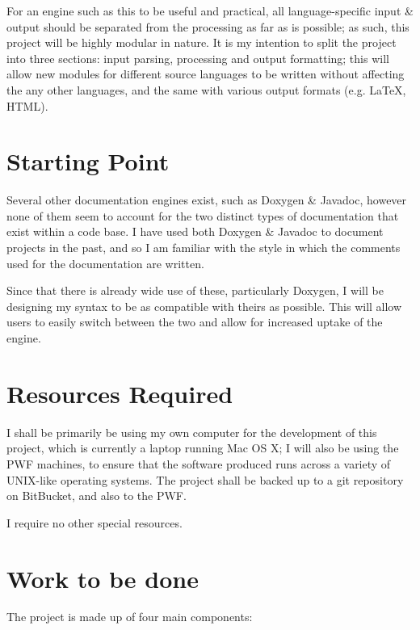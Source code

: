 For an engine such as this to be useful and practical, all
language-specific input \& output should be separated from the
processing as far as is possible; as such, this project will be highly
modular in nature. It is my intention to split the project into three
sections: input parsing, processing and output formatting; this will
allow new modules for different source languages to be written without
affecting the any other languages, and the same with various output
formats (e.g. \LaTeX, HTML).

\pagebreak

\section{Starting Point}

Several other documentation engines exist, such as Doxygen \& Javadoc,
however none of them seem to account for the two distinct types of
documentation that exist within a code base. I have used both Doxygen
\& Javadoc to document projects in the past, and so I am familiar with
the style in which the comments used for the documentation are
written.

Since that there is already wide use of these, particularly Doxygen,
I will be designing my syntax to be as compatible with theirs as
possible. This will allow users to easily switch between the two and
allow for increased uptake of the engine.

\section{Resources Required}

I shall be primarily be using my own computer for the development of
this project, which is currently a laptop running Mac OS X; I will
also be using the PWF machines, to ensure that the software produced
runs across a variety of UNIX-like operating systems. The project
shall be backed up to a git repository on BitBucket, and also to the
PWF.

I require no other special resources.

\section{Work to be done}

The project is made up of four main components:

